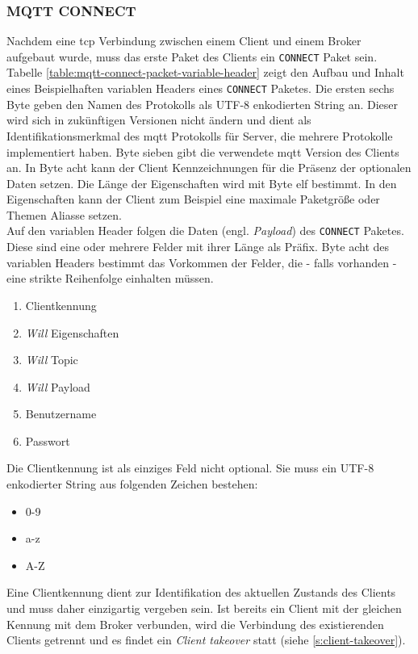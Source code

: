 \subsubsection{MQTT CONNECT} \label{s:mqtt-connect}
Nachdem eine \ac{tcp} Verbindung zwischen einem Client und einem Broker aufgebaut wurde, muss das erste Paket des Clients ein \verb|CONNECT| Paket sein.
Tabelle \ref{table:mqtt-connect-packet-variable-header} zeigt den Aufbau und Inhalt eines Beispielhaften variablen Headers eines \verb|CONNECT| Paketes.
Die ersten sechs Byte geben den Namen des Protokolls als UTF-8 enkodierten String an. Dieser wird sich in zukünftigen Versionen nicht ändern und dient als Identifikationsmerkmal des \ac{mqtt} Protokolls für Server, die mehrere Protokolle implementiert haben. Byte sieben gibt die verwendete \ac{mqtt} Version des Clients an. In Byte acht kann der Client Kennzeichnungen für die Präsenz der optionalen Daten setzen. Die Länge der Eigenschaften wird mit Byte elf bestimmt. In den Eigenschaften kann der Client zum Beispiel eine maximale Paketgrö{\ss}e oder Themen Aliasse setzen.\cite{mqtt5Specification}\\
Auf den variablen Header folgen die Daten (engl. \textit{Payload}) des \verb|CONNECT| Paketes. Diese sind eine oder mehrere Felder mit ihrer Länge als Präfix. Byte acht des variablen Headers bestimmt das Vorkommen der Felder, die - falls vorhanden - eine strikte Reihenfolge einhalten müssen.
\cite{mqtt5Specification}
\begin{enumerate}
    \item Clientkennung
    \item \textit{Will} Eigenschaften
    \item \textit{Will} Topic
    \item \textit{Will} Payload
    \item Benutzername
    \item Passwort
\end{enumerate}
Die Clientkennung ist als einziges Feld nicht optional. Sie muss ein UTF-8 enkodierter String aus folgenden Zeichen bestehen:
\begin{itemize}
    \item 0-9
    \item a-z
    \item A-Z
\end{itemize}
Eine Clientkennung dient zur Identifikation des aktuellen Zustands des Clients und muss daher einzigartig vergeben sein. Ist bereits ein Client mit der gleichen Kennung mit dem Broker verbunden, wird die Verbindung des existierenden Clients getrennt und es findet ein \textit{Client takeover} statt (siehe \ref{s:client-takeover}).
